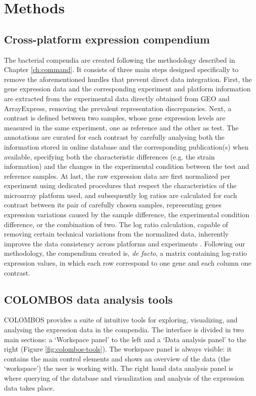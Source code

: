 \section{Methods}


\subsection{Cross-platform expression compendium} 
\label{sec:colombos-comp-method}


The bacterial compendia are created following the methodology described in  Chapter \ref{ch:command}. It consists of three main steps designed specifically to remove the  aforementioned hurdles that prevent direct data integration. First, the gene expression data and the corresponding experiment and platform  information are extracted from the experimental data directly obtained from  GEO and ArrayExpress, removing the prevalent representation discrepancies. Next, a contrast is defined between two samples, whose gene expression levels  are measured in the same experiment, one as reference and the other as test. The annotations are curated for each contrast by carefully analysing both the  information stored in online database and the corresponding publication(s) when  available, specifying both the characteristic differences (e.g. the strain  information) and the changes in the experimental condition between the test  and reference samples. At last, the raw expression data are first normalized per experiment using  dedicated procedures that respect the characteristics of the microarray  platform used, and subsequently log ratios are calculated for each contrast  between its pair of carefully chosen samples, representing genes expression  variations caused by the sample difference, the experimental condition  difference, or the combination of two. The log ratio calculation, capable of removing certain technical variations  from the normalized data, inherently improves the data consistency across  platforms and experiments \cite{Shi2006, Shi2008}. Following our methodology, the compendium created is, \textit{de facto}, a  matrix containing log-ratio expression values, in which each row correspond to  one gene and each column one contrast. 

\subsection{COLOMBOS data analysis tools}
COLOMBOS provides a suite of intuitive tools for exploring, visualizing,  and analysing the expression data in the compendia. The interface is divided in  two main sections: a `Workspace panel' to the left and a `Data analysis panel'  to the right (Figure \ref{fig:colombos-tools}). The workspace panel is always  visible: it contains the main control elements and shows an overview of the  data (the `workspace') the user is working with. The right hand data analysis  panel is where querying of the database and visualization and analysis of the  expression data takes place.

